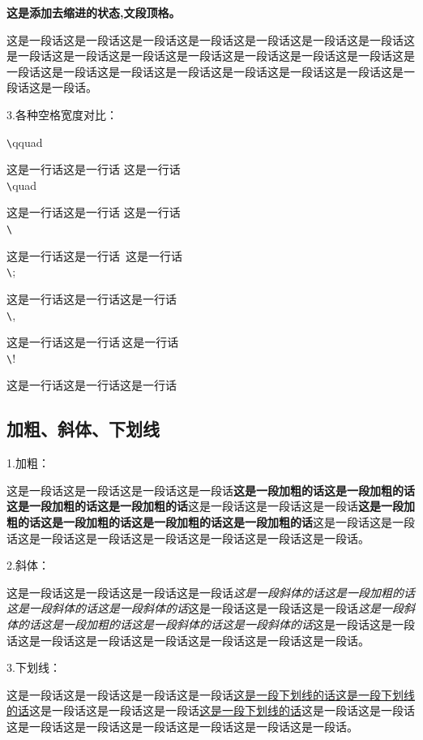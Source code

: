 \documentclass{article}   %
\begin{document}
			\noindent \textbf{这是添加去缩进的状态,文段顶格。}
			
			\noindent 这是一段话这是一段话这是一段话这是一段话这是一段话这是一段话这是一段话这是一段话这是一段话这是一段话这是一段话这是一段话这是一段话这是一段话这是一段话这是一段话这是一段话这是一段话这是一段话这是一段话这是一段话这是一段话这是一段话。
			
      \noindent 3.各种空格宽度对比：
      
		\noindent\verb|\|qquad 
		
		  \noindent	这是一行话这是一行话 \qquad 这是一行话\\
		 \verb|\|quad 
		 
		  	 \noindent	这是一行话这是一行话 \quad 这是一行话\\
		  \verb|\| 
		  	  	
		  	 \noindent	这是一行话这是一行话\ 这是一行话\\
		  \verb|\|;
		  
		  	 \noindent	这是一行话这是一行话\;这是一行话\\
		  \verb|\|, 
		  	
		  	 \noindent	这是一行话这是一行话\,这是一行话\\
		  \verb|\|!	
		  
		  	 \noindent	这是一行话这是一行话\!这是一行话\\
		  	
		\subsection{加粗、斜体、下划线}
		
		\noindent 1.加粗：
		
		这是一段话这是一段话这是一段话这是一段话\textbf{这是一段加粗的话这是一段加粗的话这是一段加粗的话这是一段加粗的话}这是一段话这是一段话这是一段话\textbf{这是一段加粗的话这是一段加粗的话这是一段加粗的话这是一段加粗的话}这是一段话这是一段话这是一段话这是一段话这是一段话这是一段话这是一段话这是一段话。
		
		\noindent 2.斜体：
		
			这是一段话这是一段话这是一段话这是一段话\textit{这是一段斜体的话这是一段加粗的话这是一段斜体的话这是一段斜体的话}这是一段话这是一段话这是一段话\textit{这是一段斜体的话这是一段加粗的话这是一段斜体的话这是一段斜体的话}这是一段话这是一段话这是一段话这是一段话这是一段话这是一段话这是一段话这是一段话。
		
		\noindent 3.下划线：
		
			这是一段话这是一段话这是一段话这是一段话\underline{这是一段下划线的话这是一段下划线的话}这是一段话这是一段话这是一段话\underline{这是一段下划线的话}这是一段话这是一段话这是一段话这是一段话这是一段话这是一段话这是一段话这是一段话。
			
\end{document}
